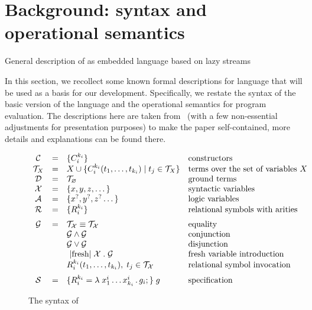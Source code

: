 \section{Background: syntax and operational semantics}
\label{sec:background}

\colorbox{red!20}{\parbox{\textwidth}{General description of \mK as embedded language based on lazy streams}}

In this section, we recollect some known formal descriptions for \mK language that will be used as a basis for our development.
Specifically, we restate the syntax of the basic version of the language and the operational semantics for program evaluation.
The descriptions here are taken from~\cite{CertifiedSemantics} (with a few non-essential adjustments for presentation purposes) to make
the paper self-contained, more details and explanations can be found there.

\begin{figure}[t]
\centering
\[
\begin{array}{ccll}
  \mathcal{C} & = & \{C_i^{k_i}\} & \mbox{constructors} \\
  \mathcal{T}_X & = & X \cup \{C_i^{k_i} (t_1, \dots, t_{k_i}) \mid t_j\in\mathcal{T}_X\} & \mbox{terms over the set of variables $X$} \\
  \mathcal{D} & = & \mathcal{T}_\emptyset & \mbox{ground terms}\\
  \mathcal{X} & = & \{ x, y, z, \dots \} & \mbox{syntactic variables} \\
  \mathcal{A} & = & \{ x^?, y^?, z^? \dots \} & \mbox{logic variables} \\
  \mathcal{R} & = & \{ R_i^{k_i}\} &\mbox{relational symbols with arities} \\[2mm]
  \mathcal{G} & = & \mathcal{T_X}\equiv\mathcal{T_X}   &  \mbox{equality} \\
              &   & \mathcal{G}\wedge\mathcal{G}     & \mbox{conjunction} \\
              &   & \mathcal{G}\vee\mathcal{G}       &\mbox{disjunction} \\
              &   & \mbox{\lstinline|fresh|}\;\mathcal{X}\;.\;\mathcal{G} & \mbox{fresh variable introduction} \\
              &   & R_i^{k_i} (t_1,\dots,t_{k_i}),\;t_j\in\mathcal{T_X} & \mbox{relational symbol invocation} \\[2mm]
  \mathcal{S} & = & \{R_i^{k_i} = \lambda\;x_1^i\dots x_{k_i}^i\,.\, g_i;\}\; g & \mbox{specification}
\end{array}
\]
\caption{The syntax of \mK}
\label{fig:syntax}
\end{figure}

